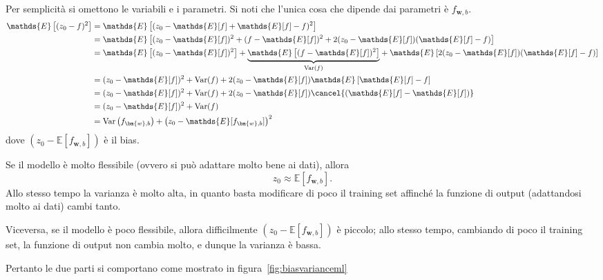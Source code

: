 \documentclass[10pt]{book}
\newcommand{\1}{\mathds{1}}
\newcommand{\media}{\mathds{E}}
\newcommand{\parentesi}[2]{%
\underset{#1}{\underbrace{#2}}%
}
\theoremstyle{definition}%
\theoremstyle{plain}
\theoremstyle{remark}
\begin{document}
Per semplicità si omettono le variabili e i parametri. Si noti che l'unica cosa che dipende dai parametri è \(f_{\bm{w},b}\).
\begin{align*}
\media\left[(z_{0} - f)^2\right]
&= \media\left[(z_{0} - \media[f] + \media[f] - f)^2\right] \\
&= \media\left[(z_{0} - \media[f])^2 + (f - \media[f])^2 + 2(z_{0} - \media[f])(\media[f] - f)\right] \\
&= \media\left[(z_{0} - \media[f])^2\right]
   + \parentesi{\mathrm{Var}(f)}{\media\left[(f - \media[f])^2\right]}
   + \media\left[2(z_{0} - \media[f])(\media[f] - f)\right] \\
&= (z_{0} - \media[f])^2 + \mathrm{Var}(f) + 2(z_{0} - \media[f]) {\media\left[\media[f] - f\right]}\\
&= (z_{0} - \media[f])^2 + \mathrm{Var}(f) + 2(z_{0} - \media[f]) \cancel{\left(\media[f] - \media [f]\right)}\\
&= (z_{0} - \media[f])^2 + \mathrm{Var}(f) \\
&= \mathrm{Var}\left(f_{\bm{w},b}\right) + \left(z_{0} - \media[f_{\bm{w},b}]\right)^2
\end{align*}
dove \(\left(z_{0} - \media[f_{\bm{w},b}]\right)\) è il bias.

Se il modello è molto flessibile (ovvero si può adattare molto bene ai dati), allora
\begin{equation*}
z_{0}\approx \media[f_{\bm{w},b}].
\end{equation*}
Allo stesso tempo la varianza è molto alta, in quanto basta modificare di poco il training set affinché la funzione di output (adattandosi molto ai dati) cambi tanto.

Viceversa, se il modello è poco flessibile, allora difficilmente \(\left(z_{0} - \media[f_{\bm{w},b}]\right)\) è piccolo; allo stesso tempo, cambiando di poco il training set, la funzione di output non cambia molto, e dunque la varianza è bassa.

Pertanto le due parti si comportano come mostrato in figura~\ref{fig:biasvarianceml}
\end{document}

